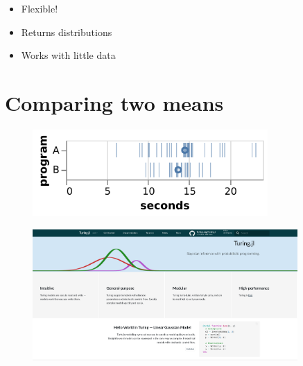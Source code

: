 \documentclass[aspectratio=169,xcolor=svgnames]{beamer}
\begin{document}
\begin{frame}
  \begin{itemize}
  \item Flexible!
  \item Returns distributions
  \item Works with little data
  \end{itemize}
\end{frame}

\section{Comparing two means}

\begin{frame}
  \begin{figure}[ht]
    \centering
    \includegraphics[width=0.8\textwidth]{figures/samples_a_b.pdf}
  \end{figure}
\end{frame}

\begin{frame}
\begin{figure}[ht]
  \centering
  \includegraphics[width=0.9\textwidth]{figures/turingjl.png}
\end{figure}
\end{frame}

\newcommand{\parameter}[1]{\textcolor{orange}{#1}}
\newcommand{\observed}[1]{\textcolor{cyan}{#1}}
\end{document}
